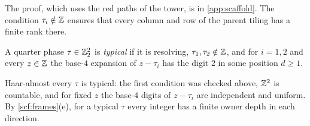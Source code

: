 The proof, which uses the red paths of the tower, is in \cref{app:scaffold}. The condition $\tau_i\notin\mathbb{Z}$ ensures that every column and row of the parent tiling has a finite rank there.

\begin{definition}\label{scf:def-typical}
A quarter phase $\tau\in\mathbb{Z}_2^2$ is \emph{typical} if it is resolving, $\tau_1,\tau_2\notin\mathbb{Z}$, and for $i=1,2$ and every $z\in\mathbb{Z}$ the base-$4$ expansion of $z-\tau_i$ has the digit $2$ in some position $d\ge1$.
\end{definition}

Haar-almost every $\tau$ is typical: the first condition was checked above, $\mathbb{Z}^2$ is countable, and for fixed $z$ the base-$4$ digits of $z-\tau_i$ are independent and uniform. By \cref{scf:frames}(e), for a typical $\tau$ every integer has a finite owner depth in each direction.
